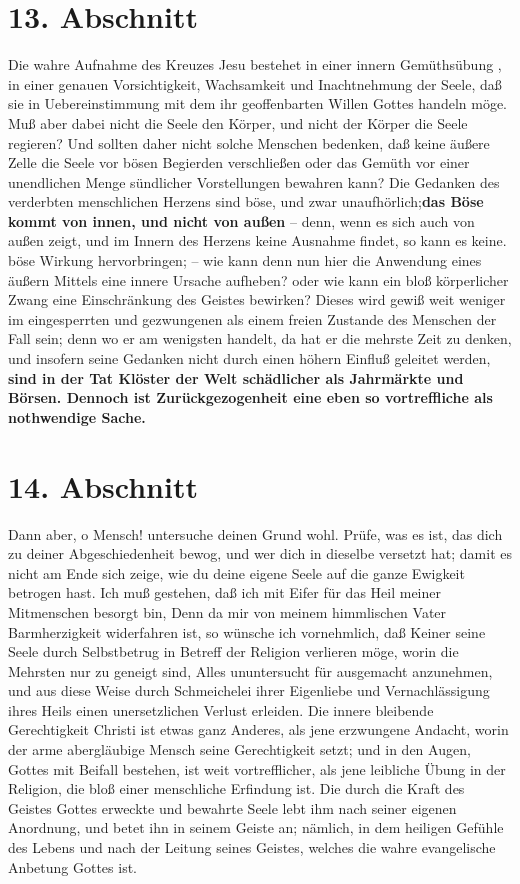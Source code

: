 \section{13. Abschnitt} \label{kap5_ab13}

Die wahre Aufnahme des Kreuzes Jesu bestehet in einer innern Gemüthsübung , in
einer genauen Vorsichtigkeit, Wachsamkeit und Inachtnehmung der Seele, daß sie
in Uebereinstimmung mit dem ihr geoffenbarten Willen Gottes
 handeln möge. Muß
aber dabei nicht die Seele den Körper, und nicht der Körper die Seele regieren?
Und sollten daher nicht solche Menschen bedenken, daß keine äußere Zelle die
Seele vor bösen Begierden verschließen oder das Gemüth vor einer unendlichen
Menge sündlicher Vorstellungen bewahren kann? Die Gedanken des verderbten
menschlichen Herzens sind böse, und zwar unaufhörlich;\textbf{das Böse kommt von innen,
und nicht von außen} -- denn, wenn es sich auch von außen zeigt, und im Innern
des Herzens keine Ausnahme findet, so kann es keine. böse Wirkung hervorbringen;
-- wie kann denn nun hier die Anwendung eines äußern Mittels eine innere Ursache
aufheben? oder wie kann ein bloß körperlicher Zwang eine Einschränkung des
Geistes bewirken? Dieses wird gewiß weit weniger im eingesperrten und
gezwungenen als einem freien Zustande des Menschen der Fall sein; denn wo er am
wenigsten handelt, da hat er die mehrste Zeit zu denken, und insofern seine
Gedanken nicht durch einen höhern Einfluß geleitet werden, \textbf{sind in der Tat
Klöster der Welt schädlicher als Jahrmärkte und Börsen. Dennoch ist
Zurückgezogenheit eine eben so vortreffliche als nothwendige Sache.} 

\section{14. Abschnitt} \label{kap5_ab14}

Dann aber, o Mensch! untersuche deinen Grund wohl. Prüfe, was es ist, das dich
zu deiner Abgeschiedenheit bewog, und wer dich in dieselbe versetzt hat; damit
es nicht am Ende sich zeige, wie du deine eigene Seele auf die ganze Ewigkeit
betrogen hast. Ich muß gestehen, daß ich mit Eifer für das Heil meiner
Mitmenschen besorgt bin, Denn da mir von meinem himmlischen Vater
Barmherzigkeit widerfahren ist, so wünsche ich vornehmlich, daß Keiner seine
Seele durch Selbstbetrug in Betreff der Religion verlieren möge, worin die
Mehrsten nur zu geneigt sind, Alles ununtersucht für ausgemacht anzunehmen, und
aus diese Weise durch Schmeichelei ihrer Eigenliebe und Vernachlässigung ihres
Heils einen unersetzlichen Verlust erleiden. Die innere bleibende Gerechtigkeit
Christi ist etwas ganz Anderes, als jene erzwungene Andacht, worin der arme
abergläubige Mensch seine Gerechtigkeit setzt; und in den Augen, Gottes mit
Beifall bestehen, ist weit vortrefflicher, als jene leibliche Übung in der
Religion, die bloß einer menschliche Erfindung ist. Die durch die Kraft des
Geistes Gottes erweckte und bewahrte Seele lebt ihm nach seiner eigenen
Anordnung, und betet ihn in seinem Geiste an; nämlich, in dem heiligen Gefühle
des Lebens und nach der Leitung seines Geistes, welches die wahre evangelische
Anbetung Gottes ist.

